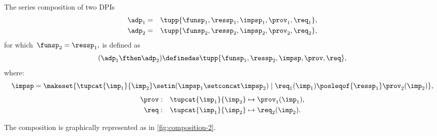 \begin{definition}
    \label{def:series-composition}
    The series composition of two DPIs
    \begin{equation}
        \begin{aligned}
            \adp_{1} & = & \tupp{\funsp_{1},\ressp_{1},\impsp_{1},\prov_{1},\req_{1}}, \\
            \adp_{2} & = & \tupp{\funsp_{2},\ressp_{2},\impsp_{2},\prov_{2},\req_{2}},
        \end{aligned}
    \end{equation}
    for which~$\funsp_{2}=\ressp_{1},$ is defined as
    \begin{equation}
        (\adp_{1} \fthen \adp_{2})
        \definedas
        \tupp{ \funsp_{1},\ressp_{2},\impsp,\prov,\req},
    \end{equation}
    where:
    \begin{equation}
        \impsp  =  \makeset{
            \tupcat {\imp_{1}} {\imp_{2}} \setin (\impsp_{1} \setconcat \impsp_{2})\mid\req_{1}(\imp_{1})\posleqof{\ressp_{1}}\prov_{2}(\imp_{2})
        },
    \end{equation}
    \begin{equation}
        \begin{aligned}
            \prov & : & \tupcat {\imp_{1}} {\imp_{2}} & \mapsto\prov_{1}(\imp_{1}), \\
            \req  & : & \tupcat {\imp_{1}} {\imp_{2}} & \mapsto\req_{2}(\imp_{2}).
        \end{aligned}
    \end{equation}
\end{definition}

\begin{marginfigure}
    \centering
    \caption{}
    \label{fig:composition-2}
\end{marginfigure}

The composition is graphically represented as in \cref{fig:composition-2}.

